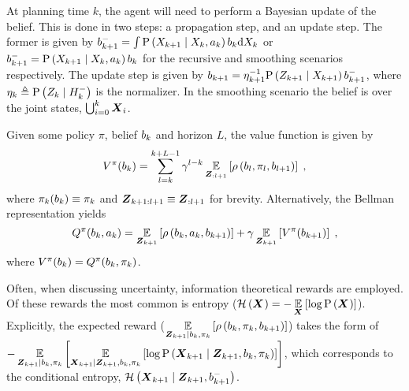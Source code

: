 At planning time $k$, the agent will need to perform a Bayesian update of the belief. This is done in two steps: a propagation step, and an update step. The former is given by	$\priorB{k+1}=\int\probcond{\states{k+1}}{\states{k},\action{k}}\blf{k}\D\states{k}$ or	$\priorB{k+1}=\probcond{\states{k+1}}{\states{k},\action{k}}\blf{k}$ for the recursive and smoothing scenarios respectively. The update step is given by $\blf{k+1}=\normalizer{k+1}^{-1}\probcond{\observations{k+1}}{\states{k+1}}\priorB{k+1}$, where $\normalizer{k}\triangleq\probcond{\observations{k}}{\priorHist{k}}$ is the normalizer. In the smoothing scenario the belief is over the joint states, $\bigcup_{i=0}^k\statesRV{i}$.

Given some policy $\pi$, belief $\blf{k}$ and horizon $L$, the value function is given by
\begin{equation}
	V^\pi(\blf{k})=\sum_{l=k}^{k+L-1}\gamma^{l-k}\expectation{\reward{\blf{l},\pi_l,\blf{l+1}}}{\observationsRV{:l+1}}\;,\label{eq:value_function}
\end{equation}
where $\pi_k(\blf{k})\equiv \pi_k$ and $\observationsRV{k+1:l+1}\equiv \observationsRV{:l+1}$ for brevity. Alternatively, the Bellman representation yields
\begin{equation}
	Q^\pi(\blf{k},\action{k})=\expectation{\reward{\blf{k},\action{k},\blf{k+1}}}{\observationsRV{k+1}}+\gamma\expectation{V^\pi(\blf{k+1})}{\observationsRV{k+1}}\;,\label{eq:bellman}
\end{equation}
where $V^\pi(\blf{k})=Q^\pi(\blf{k},\pi_k)$.

Often, when discussing uncertainty, information theoretical rewards are employed. Of these rewards the most common is entropy ($\entropy{\statesRV{}}=-\expectation{\log\prob{\statesRV{}}}{\statesRV{}}$). Explicitly, the expected reward ($\expectation{\reward{\blf{k},\pi_k,\blf{k+1}}}{\observationsRV{k+1}\mid\blf{k},\pi_k}$) takes the form of
$-\expectation{\expectation{\log\probcond{\statesRV{k+1}}{\observationsRV{k+1},\blf{k},\pi_k}}{\statesRV{k+1}\mid\observationsRV{k+1},\blf{k},\pi_k}}{\observationsRV{k+1}\mid\blf{k},\pi_k}$, which corresponds to the conditional entropy, $\condEntropy{\statesRV{k+1}}{\observationsRV{k+1},\priorB{k+1}}$.

